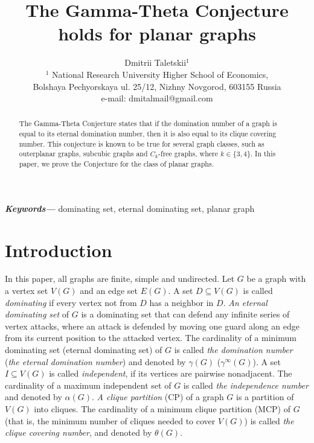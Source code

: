 \documentclass[12pt]{article}
\title{The Gamma-Theta Conjecture holds for planar graphs}
\author{Dmitrii Taletskii$^{1}$\\
\small
$^1$ National Research University Higher School of Economics, \\
\small
Bolshaya Pechyorskaya ul. 25/12, Nizhny Novgorod, 603155 Russia\\%
    \small
    e-mail: dmitalmail@gmail.com
}
\date{} %
\providecommand{\keywords}[1]
{
  \small	
  \textbf{\textit{Keywords---}} #1
}
\begin{document}
\maketitle

\begin{abstract}
The Gamma-Theta Conjecture states that if the domination number of a graph is equal to its eternal domination number, then it is also equal to its clique covering number. This conjecture is known to be true for several graph classes, such as outerplanar graphs, subcubic graphs and $C_k$-free graphs, where $k \in \{3,4\}$. In this paper, we prove the Conjecture for the class of planar graphs.
\end{abstract} \hspace{10pt}

\keywords{dominating set, eternal dominating set, planar graph}

\section{Introduction}

In this paper, all graphs are finite, simple and undirected.  Let $G$ be a graph with a vertex set $V(G)$ and an edge set $E(G)$. A set $D \subseteq V(G)$ is called \textit{dominating} if every vertex not from $D$ has a neighbor in $D$. \textit{An eternal dominating set} of $G$ is a dominating set that can defend any infinite series of vertex attacks,
where an attack is defended by moving one guard along an edge from its current
position to the attacked vertex. The cardinality of a minimum dominating  set (eternal dominating set) of $G$ is called \textit{the domination number} (\textit{the eternal domination number}) and denoted by $\gamma(G)$ ($\gamma^{\infty}(G)$). A set $I \subseteq V(G)$ is called \textit{independent}, if its vertices are pairwise nonadjacent. The cardinality of a maximum independent set of $G$ is called \textit{the independence number} and denoted by $\alpha(G)$.  \textit{A clique partition} (CP) of a graph $G$ is a partition of $V(G)$ into cliques. The cardinality of a minimum clique partition (MCP) of $G$ (that is, the minimum number of cliques needed to cover $V(G)$) is called \textit{the clique covering number}, and denoted by $\theta(G)$.

\end{document}
